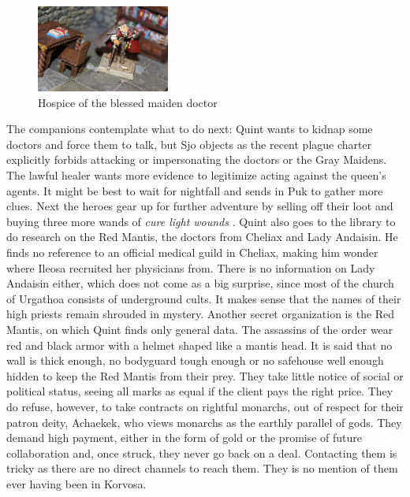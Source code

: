 \begin{figure}[h]
	\centering
	\includegraphics[width=0.39\textwidth]{images/Hospice-of-the-blessed-maiden-doctor-515717926.jpg}
	\caption{Hospice of the blessed maiden doctor}
	\label{fig:Hospice-of-the-blessed-maiden-doctor-515717926}
\end{figure}

The companions contemplate what to do next: Quint wants to kidnap some doctors and force them to talk, but Sjo objects as the recent plague charter explicitly forbids attacking or impersonating the doctors or the Gray Maidens. The lawful healer wants more evidence to legitimize acting against the queen's agents. It might be best to wait for nightfall and sends in Puk to gather more clues. Next the heroes gear up for further adventure by selling off their loot and buying three more wands of {\itshape cure light wounds} . Quint also goes to the library to do research on the Red Mantis, the doctors from Cheliax and Lady Andaisin. He finds no reference to an official medical guild in Cheliax, making him wonder where Ileosa recruited her physicians from. There is no information on Lady Andaisin either, which does not come as a big surprise, since most of the church of Urgathoa consists of underground cults. It makes sense that the names of their high priests remain shrouded in mystery. Another secret organization is the Red Mantis, on which Quint finds only general data. The assassins of the order wear red and black armor with a helmet shaped like a mantis head. It is said that no wall is thick enough, no bodyguard tough enough or no safehouse well enough hidden to keep the Red Mantis from their prey. They take little notice of social or political status, seeing all marks as equal if the client pays the right price. They do refuse, however, to take contracts on rightful monarchs, out of respect for their patron deity, Achaekek, who views monarchs as the earthly parallel of gods. They demand high payment, either in the form of gold or the promise of future collaboration and, once struck, they never go back on a deal. Contacting them is tricky as there are no direct channels to reach them. They is no mention of them ever having been in Korvosa.\\

